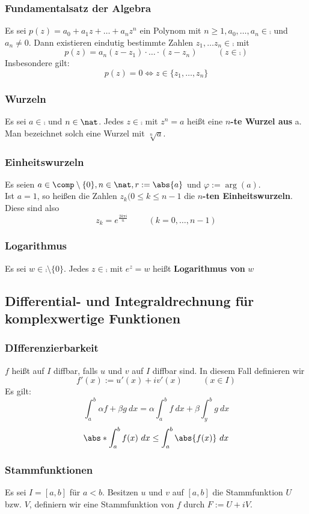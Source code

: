 \documentclass{kit}
\begin{document}
    \subsubsection{Fundamentalsatz der Algebra}
      Es sei $p(z)=a_0+a_1z+\dots+a_nz^n$ ein Polynom mit $n\ge1,a_0,\dots,a_n\in\comp$ und $a_n\neq0$. Dann existieren
      eindutig bestimmte Zahlen $z_1,\dots z_n\in\comp$ mit
      $$p(z)=a_n(z-z_1)\cdot\dots\cdot(z-z_n)\hspace{1cm}(z\in\comp)$$
      Insbesondere gilt:
      $$p(z)=0\Longleftrightarrow z\in\{z_1,\dots,z_n\}$$
    \subsubsection{Wurzeln}
      Es sei $a\in\comp$ und $n\in\nat$. Jedes $z\in\comp$ mit $z^n=a$ heißt eine $n$\textbf{-te Wurzel aus} a. Man bezeichnet
      solch eine Wurzel mit $\sqrt[n]{a}$.
    \subsubsection{Einheitswurzeln}
      Es seien $a\in\comp\setminus\{0\},n\in\nat,r:=\abs{a}$ und $\varphi:=\arg(a)$.\\
      Ist $a=1$, so heißen die Zahlen $z_k(0\le k\le n-1$ die $n$\textbf{-ten Einheitswurzeln}. Diese sind also
      $$z_k=e^{\frac{2k\pi i}{n}}\hspace{1cm}(k=0,\dots,n-1)$$
    \subsubsection{Logarithmus}
      Es sei $w\in\comp\setminus\{0\}$. Jedes $z\in\comp$ mit $e^z=w$ heißt \textbf{Logarithmus von} $w$
  \subsection{Differential- und Integraldrechnung für komplexwertige Funktionen}
    \subsubsection{DIfferenzierbarkeit}
      $f$ heißt auf $I$ diffbar, falls $u$ und $v$ auf $I$ diffbar sind. In diesem Fall definieren wir
      $$f'(x):=u'(x)+iv'(x)\hspace{1cm}(x\in I)$$
      Es gilt:
      $$\int^b_a\alpha f+\beta g\ dx=\alpha\int^b_af\ dx+\beta\int^b_yg\ dx$$
      $$\abs*{\int^b_af(x)\ dx}\le\int^b_a\abs{f(x)}\ dx$$
    \subsubsection{Stammfunktionen}
      Es sei $I=[a,b]$ für $a<b$. Besitzen $u$ und $v$ auf $[a,b]$ die Stammfunktion $U$ bzw. $V$, definiern wir eine
      Stammfunktion von $f$ durch $F:=U+iV.$
\end{document}
